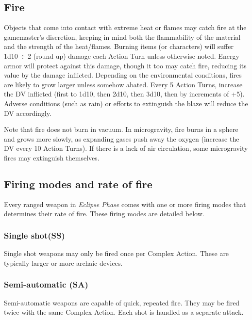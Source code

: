 \subsection{Fire}
\label{sec:fire}

Objects that come into contact with extreme heat or flames may catch fire at the gamemaster’s discretion, keeping in mind both the flammability of the material and the strength of the heat/flames. Burning items (or characters) will suffer 1d10 $\div$ 2 (round up) damage each Action Turn unless otherwise noted. Energy armor will protect against this damage, though it too may catch fire, reducing its value by the damage inflicted. Depending on the environmental conditions, fires are likely to grow larger unless somehow abated. Every 5 Action Turns, increase the DV inflicted (first to 1d10, then 2d10, then 3d10, then by increments of +5). Adverse conditions (such as rain) or efforts to extinguish the blaze will reduce the DV accordingly.

Note that fire does not burn in vacuum. In microgravity, fire burns in a sphere and grows more slowly, as expanding gases push away the oxygen (increase the DV every 10 Action Turns). If there is a lack of air circulation, some microgravity fires may extinguish themselves.


\subsection{Firing modes and rate of fire}
\label{sec:firing-modes-rate}

Every ranged weapon in \emph{Eclipse Phase} comes with one or more firing modes that determines their rate of fire. These firing modes are detailed below.

\subsubsection{Single shot(SS)}

Single shot weapons may only be fired once per Complex Action. These are typically larger or more archaic devices.

\subsubsection{Semi-automatic (SA)}

Semi-automatic weapons are capable of quick, repeated fire. They may be fired twice with the same Complex Action. Each shot is handled as a separate attack.

